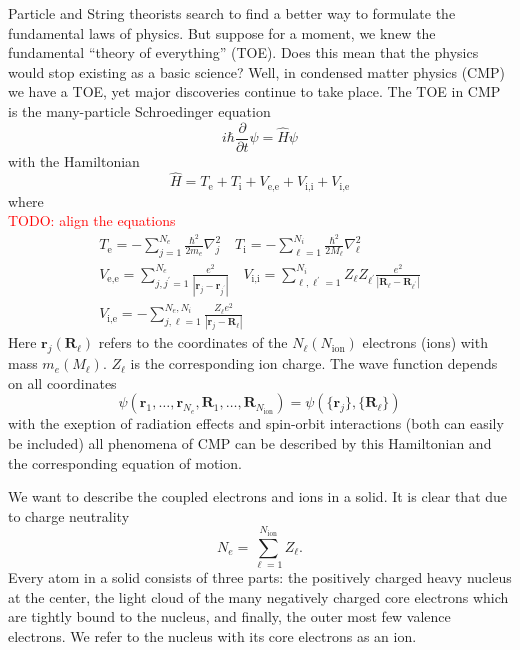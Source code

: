 \documentclass[11pt]{book}
\renewcommand{\vec}[1]{\bm{#1}}
\newcommand{\ion}{\text{ion}}
\newcommand{\pdv}[2]{\frac{\partial #1}{\partial #2}}
\begin{document}
Particle and String theorists search to find a better way to formulate the fundamental laws of physics. But suppose for a moment, we knew the fundamental ``theory of everything'' (TOE). Does this mean that the physics would stop existing as a basic science? Well, in condensed matter physics (CMP) we have a TOE, yet major discoveries continue to take place. The TOE in CMP is the many-particle Schroedinger equation
\begin{equation}
  i\hbar \pdv{}{t} \psi = \hat{H} \psi
\end{equation}
with the Hamiltonian 
\begin{equation}
  \label{TOE}
  \hat{H} = T_{\text{e}} + T_{\text{i}}+ V_{\text{e},\text{e}}+ V_{\text{i},\text{i}}+ V_{\text{i},\text{e}}
\end{equation}
where\\
\textcolor{red}{TODO: align the equations}
\begin{eqnarray}
  T_{\text{e}} = - \sum_{j=1}^{N_e} \frac{\hbar^2}{2 m_e} \nabla_j^2 \quad T_{\text{i}} = - \sum_{\ell=1}^{N_i} \frac{\hbar^2}{2 M_{\ell}} \nabla_{\ell}^2\\
  V_{\text{e},\text{e}} = \sum_{j,j^\prime =1}^{N_e} \frac{e^2}{\left|\vec{r}_j - \vec{r}_{j^\prime}\right|}\quad   V_{\text{i},\text{i}} = \sum_{\ell,\ell^\prime =1}^{N_i} Z_{\ell} Z_{\ell^\prime}\frac{e^2}{\left|\vec{R}_{\ell} - \vec{R}_{\ell^\prime}\right|} \\
  V_{\text{i},\text{e}} = -\sum_{j,\ell =1}^{N_e,N_i} \frac{Z_{\ell}e^2}{\left|\vec{r}_j - \vec{R}_{\ell}\right|}
\end{eqnarray}
Here $\vec{r}_j (\vec{R}_{\ell})$ refers to the coordinates of the $N_{\ell}(N_{\ion})$ electrons (ions) with mass $m_e(M_{\ell})$. $Z_{\ell}$ is the corresponding ion charge. The wave function depends on all coordinates \[\psi(\vec{r}_1,\dots, \vec{r}_{N_e}, \vec{R}_1, \dots,\vec{R}_{N_{\ion}})= \psi \left(\{\vec{r}_j\},\{\vec{R}_{\ell}\}\right) \] 
with the exeption of radiation effects and spin-orbit interactions (both can easily be included) all phenomena of CMP can be described by this Hamiltonian and the corresponding equation of motion.

We want to describe the coupled electrons and ions in a solid. It is clear that due to charge neutrality \[N_e = \sum_{\ell =1}^{N_{\ion}} Z_{\ell}.\]
Every atom in a solid consists of three parts: the positively charged heavy nucleus at the center, the light cloud of the many negatively charged core electrons which are tightly bound to the nucleus, and finally, the outer most few valence electrons. We refer to the nucleus with its core electrons as an ion.
\end{document}
